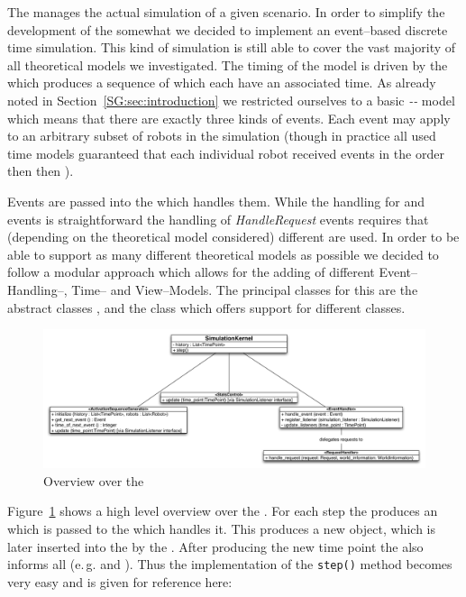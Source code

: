 The  manages the actual simulation of a given scenario. In order to simplify the development of the \RSS somewhat we decided to implement an event--based discrete time simulation. This kind of simulation is still able to cover the vast majority of all theoretical models we investigated. The timing of the model is driven by the  which produces a sequence of  which each have an associated time. As already noted in Section~\ref{SG:sec:introduction} we restricted ourselves to a basic \emph{\Look-\Compute-\HandleRequests} model which means that there are exactly three kinds of events. Each event may apply to an arbitrary subset of robots in the simulation (though in practice all used time models guaranteed that each individual robot received events in the order \emph{\Look} then \emph{\Compute} then \emph{\HandleRequests}).\smallskip

Events are passed into the  which handles them. While the handling for \emph{\Look} and \emph{\Compute} events is straightforward the handling of \emph{HandleRequest} events requires that (depending on the theoretical model considered) different  are used. In order to be able to support as many different theoretical models as possible we decided to follow a modular approach which allows for the adding of different Event--Handling--, Time-- and View--Models. The principal classes for this are the abstract classes ,  and the class  which offers support for different  classes.

\begin{figure}
	\centering
	\includegraphics[width=0.9\linewidth]{chapter_reference_fig/simulation_kernel_overview}
	\caption{Overview over the }\label{fig:simkernel_overview}
\end{figure}

\noindent
Figure~\ref{fig:simkernel_overview} shows a high level overview over the . For each step the  produces an  which is passed to the  which handles it. This produces a new  object, which is later inserted into the  by the . After producing the new time point the 
also informs all  (e.\,g.  and ). Thus the implementation of the \texttt{step()} method becomes very easy and is given for reference here:

